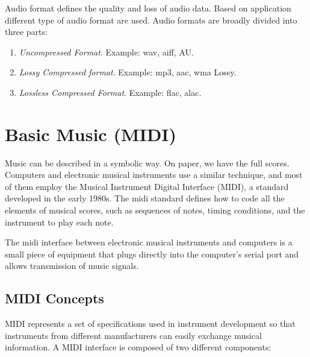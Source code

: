 Audio format defines the quality and loss of audio data. Based on application different type of audio format are used. Audio formats are broadly divided into three parts:

\begin{enumerate}
	\item \textit{Uncompressed Format}. Example: \gls{wav}, \gls{aiff}, AU.
	\item \textit{Lossy Compressed format}. Example: \gls{mp3}, \gls{aac}, \gls{wma} Lossy.
	\item \textit{Lossless Compressed Format}. Example: \gls{flac}, \gls{alac}.
\end{enumerate}

 
\section[Basic Music (MIDI)]{Basic Music (MIDI)}
Music can be described in a symbolic way. On paper, we have the full scores.
Computers and electronic musical instruments use a similar technique, and most of
them employ the Musical Instrument Digital Interface (MIDI), a standard developed in
the early 1980s. The \gls{midi} standard defines how to code all the elements of musical
scores, such as sequences of notes, timing conditions, and the instrument to play each
note.

The \gls{midi} interface between electronic musical instruments and computers is a small piece of equipment that plugs directly into the computer's serial port and allows transmission of music signals. 

\subsection[Concepts]{MIDI Concepts}
MIDI represents a set of specifications used in instrument development so that
instruments from different manufacturers can easily exchange musical information. A MIDI interface is composed of two different components:

